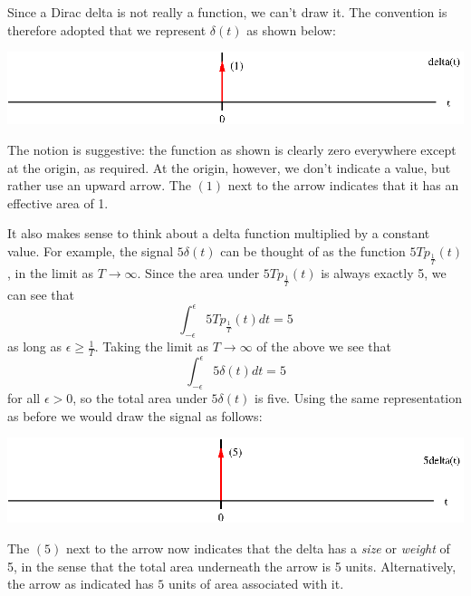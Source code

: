 \documentclass[10pt]{beamer}
\begin{document}
Since a Dirac delta is not really a function, we can't draw it.  The convention is therefore adopted that we represent $\delta(t)$ as shown below:
\begin{center}
  \includegraphics{deltafunction}
\end{center}
The notion is suggestive:  the function as shown is clearly zero everywhere except at the origin, as required.  At the origin, however, we don't indicate a value, but rather use an upward arrow.  The $(1)$ next to the arrow indicates that it has an effective area of 1.

It also makes sense to think about a delta function multiplied by a constant value.  For example, the signal $5 \delta(t)$ can be thought of as the function $5 T p_{\frac{1}{T}}(t)$, in the limit as $T \to \infty$.  Since the area under $5 T p_{\frac{1}{T}}(t)$ is always exactly 5, we can see that
\begin{equation*}
  \int_{-\epsilon}^{\epsilon} 5 T p_{\frac{1}{T}}(t) dt = 5
\end{equation*}
as long as $\epsilon \geq \frac{1}{T}$.  Taking the limit as $T \to \infty$ of the above we see that
\begin{equation*}
  \int_{-\epsilon}^{\epsilon} 5 \delta(t) dt = 5
\end{equation*}
for all $\epsilon > 0$, so the total area under $5 \delta(t)$ is five.  Using the same representation as before we would draw the signal as follows:
\begin{center}
  \includegraphics{deltafunction5}
\end{center}
The $(5)$ next to the arrow now indicates that the delta has a {\em size} or {\em weight} of 5, in the sense that the total area underneath the arrow is 5 units.  Alternatively, the arrow as indicated has $5$ units of area associated with it.
\end{document}
